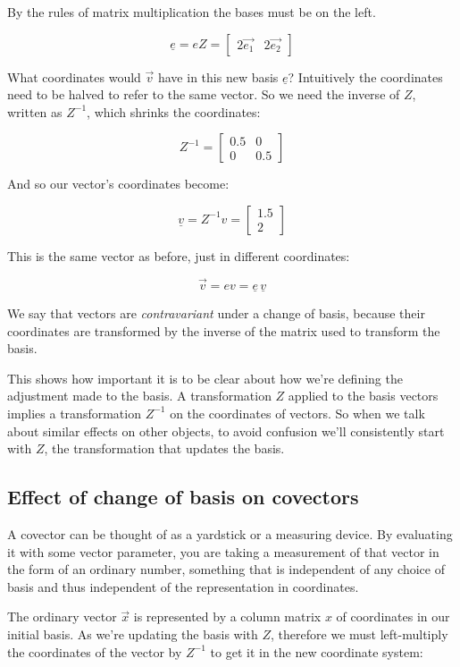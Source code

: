 By the rules of matrix multiplication the bases must be on the left.

$$\underline{e} = eZ = \begin{bmatrix}2\vec{e_1} & 2\vec{e_2}\end{bmatrix}$$

What coordinates would $\vec{v}$ have in this new basis $\underline{e}$? Intuitively the coordinates need to be halved to refer to the same vector. So we need the inverse of $Z$, written as $Z^{-1}$, which shrinks the coordinates:

$$Z^{-1} = \begin{bmatrix}0.5 & 0 \\ 0 & 0.5\end{bmatrix}$$

And so our vector's coordinates become:

$$\underline{v} = Z^{-1}v = \begin{bmatrix}1.5 \\ 2\end{bmatrix}$$

This is the same vector as before, just in different coordinates:

$$\vec{v} = ev = \underline{e} \, \underline{v}$$

We say that vectors are \textit{contravariant} under a change of basis, because their coordinates are transformed by the inverse of the matrix used to transform the basis.

This shows how important it is to be clear about how we're defining the adjustment made to the basis. A transformation $Z$ applied to the basis vectors implies a transformation $Z^{-1}$ on the coordinates of vectors. So when we talk about similar effects on other objects, to avoid confusion we'll consistently start with $Z$, the transformation that updates the basis.

\subsection{Effect of change of basis on covectors} \label{sec:vector-grow-shrink}

A covector can be thought of as a yardstick or a measuring device. By evaluating it with some vector parameter, you are taking a measurement of that vector in the form of an ordinary number, something that is independent of any choice of basis and thus independent of the representation in coordinates.

The ordinary vector $\vec{x}$ is represented by a column matrix $x$ of coordinates in our initial basis. As we're updating the basis with $Z$, therefore we must left-multiply the coordinates of the vector by $Z^{-1}$ to get it in the new coordinate system:

